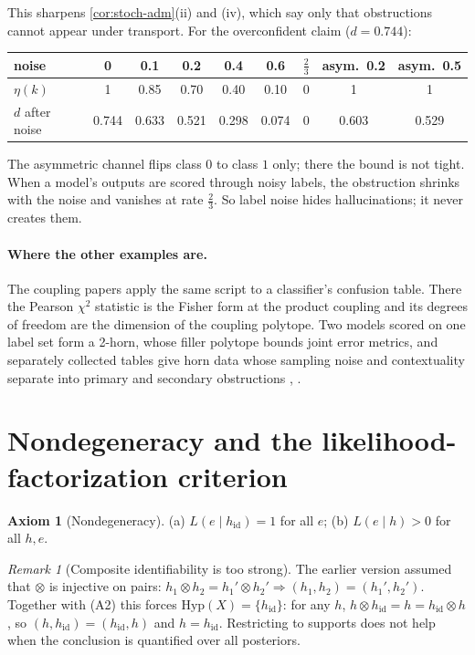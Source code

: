 \documentclass[11pt]{article}
\theoremstyle{definition}
\newtheorem{axiom}[theorem]{Axiom}
\theoremstyle{remark}
\newtheorem{remark}[theorem]{Remark}
\newcommand{\Hyp}{\mathrm{Hyp}}
\newcommand{\hid}{h_{\mathrm{id}}}
\begin{document}
This sharpens \cref{cor:stoch-adm}(ii) and (iv), which say only that obstructions cannot appear under transport. For the
overconfident claim ($d=0.744$):
\begin{center}\small
\begin{tabular}{@{}lcccccccc@{}}
\toprule
noise & 0 & 0.1 & 0.2 & 0.4 & 0.6 & $\tfrac23$ & asym.\ 0.2 & asym.\ 0.5\\
\midrule
$\eta(k)$ & 1 & 0.85 & 0.70 & 0.40 & 0.10 & 0 & 1 & 1\\
$d$ after noise & 0.744 & 0.633 & 0.521 & 0.298 & 0.074 & 0 & 0.603 & 0.529\\
\bottomrule
\end{tabular}
\end{center}
The asymmetric channel flips class $0$ to class $1$ only; there the bound is not tight. When a model's outputs are scored
through noisy labels, the obstruction shrinks with the noise and vanishes at rate $\frac23$. So label noise hides
hallucinations; it never creates them.

\paragraph{Where the other examples are.} The coupling papers apply the same script to a classifier's confusion table.
There the Pearson $\chi^2$ statistic is the Fisher form at the product coupling and its degrees of freedom are the dimension
of the coupling polytope. Two models scored on one label set form a 2-horn, whose filler polytope bounds joint error
metrics, and separately collected tables give horn data whose sampling noise and contextuality separate into primary and
secondary obstructions \cite[Sections~11--12]{Conditionals}, \cite[Section~15]{Awasthi-Family}.

\section{Nondegeneracy and the likelihood-factorization criterion}

\begin{axiom}[Nondegeneracy]\label{ax:nondeg}
(a) $L(e\mid\hid)=1$ for all $e$; (b) $L(e\mid h)>0$ for all $h,e$.
\end{axiom}

\begin{remark}[Composite identifiability is too strong]\label{rem:ci}
The earlier version assumed that $\otimes$ is injective on pairs:
$h_1\otimes h_2=h_1'\otimes h_2'\Rightarrow(h_1,h_2)=(h_1',h_2')$. Together with (A2) this forces
$\Hyp(X)=\{\hid\}$: for any $h$, $h\otimes\hid=h=\hid\otimes h$, so $(h,\hid)=(\hid,h)$ and $h=\hid$.
Restricting to supports does not help when the conclusion is quantified over all posteriors.
\end{remark}
\end{document}
